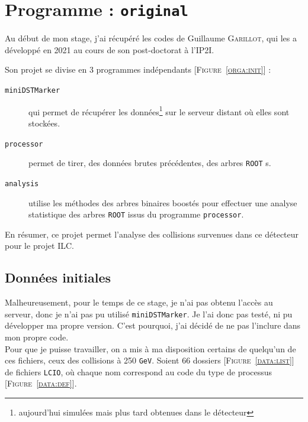 \documentclass[10pt,a4paper]{report}
\newcommand{\ROOT}{\texttt{ROOT}\xspace}
\newcommand{\LCIO}{\texttt{LCIO}\xspace}
\newcommand{\original}{\texttt{original}\xspace}
\newcommand{\GeV}{\texttt{GeV}}
\newcommand{\Figure}[1]{[\textsc{Figure~#1}]}
\begin{document}
\section{Programme : \original}

Au début de mon stage, j'ai récupéré les codes de Guillaume \textsc{Garillot}, qui les a développé en 2021 au cours de son post-doctorat à l'IP2I. 

Son projet se divise en 3 programmes indépendants \Figure{\ref{orga:init}} :

\begin{description}
	
	\item[\texttt{miniDSTMarker}] qui permet de récupérer les données\footnote{aujourd'hui simulées mais plus tard obtenues dans le détecteur} sur le serveur distant où elles sont stockées.
	
	\item[\texttt{processor}] permet de tirer, des données brutes précédentes, des arbres \ROOT s.
	
	\item[\texttt{analysis}] utilise les méthodes des arbres binaires boostés pour effectuer une analyse statistique des arbres \ROOT issus du programme \texttt{processor}.
	
\end{description} 



En résumer, ce projet permet l'analyse des collisions survenues dans ce détecteur pour le projet ILC.


\subsection{Données initiales}


Malheureusement, pour le temps de ce stage, je n'ai pas obtenu l'accès au serveur, donc je n'ai pas pu utilisé \texttt{miniDSTMarker}. Je l'ai donc pas testé, ni pu développer ma propre version. C'est pourquoi, j'ai décidé de ne pas l'inclure dans mon propre code.\\

Pour que je puisse travailler, on a mis à ma disposition certains de quelqu'un de ces fichiers, ceux des collisions à 250 \GeV. Soient 66 dossiers \Figure{\ref{data:list}} de fichiers \LCIO, où chaque nom correspond au code du type de processus \Figure{\ref{data:def}}.
\end{document}
